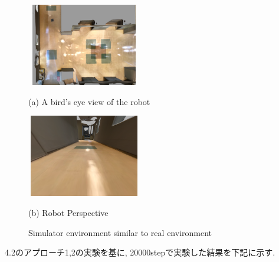 \begin{figure}[h]
  \centering
  \begin{minipage}[b]{67mm}
    \centering
    \includegraphics[width=50mm, height=36mm]{images/real_sim_up.png}
    \caption*{(a) A bird's eye view of the robot}
  \end{minipage} 
  \begin{minipage}[b]{67mm}
    \centering
    \includegraphics[width=50mm, height=36mm]{images/real_sim_robot.png}
    \caption*{(b) Robot Perspective}
  \end{minipage}
  \caption{Simulator environment similar to real environment}
  \label{Fig:real_sim}
\end{figure}

4.2のアプローチ1,2の実験を基に, 20000stepで実験した結果を下記に示す.
 


\newpage
